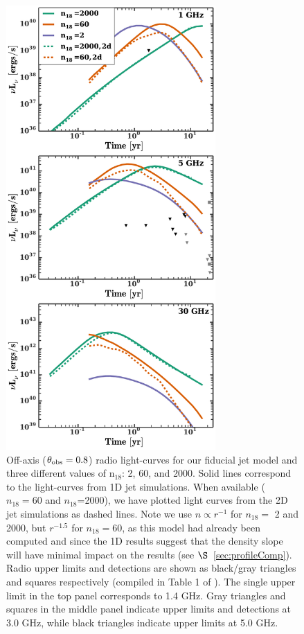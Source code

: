 \documentclass[usenatbib,fleqn]{mnras}
\begin{document}
\begin{figure} 
  \includegraphics[width=8cm]{lightcurves.pdf}
  \caption{\label{fig:lightcurves} Off-axis ($\theta_{\rm obs}=0.8$)
    radio light-curves for our fiducial jet model and three different
    values of n$_{18}$: 2, 60, and 2000. Solid lines correspond to the
    light-curves from 1D jet simulations. When available ($n_{18}=60$
    and $n_{18}$=2000), we have plotted light curves from the 2D jet
    simulations as dashed lines. Note we use $n\propto r^{-1}$ for
    $n_{18}=$ 2 and 2000, but $r^{-1.5}$ for $n_{18}=60$, as this
    model had already been computed and since the 1D results suggest
    that the density slope will have minimal impact on the results
    (see $\S$~\ref{sec:profileComp}).  Radio upper limits and
    detections are shown as black/gray triangles and squares
    respectively (compiled in Table 1 of \citealt{Mimica+2015}). The
    single upper limit in the top panel corresponds to 1.4 GHz. Gray
    triangles and squares in the middle panel indicate upper limits
    and detections at 3.0 GHz, while black triangles indicate upper
    limits at 5.0 GHz.}
\end{figure}
\end{document}
